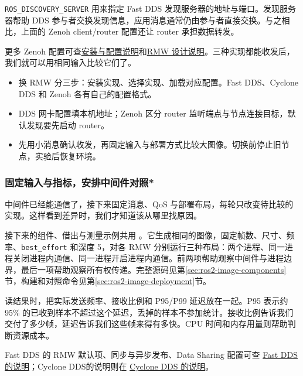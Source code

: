 \texttt{ROS\_DISCOVERY\_SERVER} 用来指定 Fast DDS 发现服务器的地址与端口。发现服务器帮助 DDS 参与者交换发现信息，应用消息通常仍由参与者直接交换。与之相比，上面的 Zenoh client/router 配置还让 router 承担数据转发。

更多 Zenoh 配置可查\href{https://github.com/ros2/rmw_zenoh/blob/humble/README.md}{安装与配置说明}和\href{https://github.com/ros2/rmw_zenoh/blob/humble/docs/design.md}{RMW 设计说明}。三种实现都能收发后，我们就可以用相同输入比较它们了。

\begin{conclusion}
\begin{itemize}
\item 换 RMW 分三步：安装实现、选择实现、加载对应配置。Fast DDS、Cyclone DDS 和 Zenoh 各有自己的配置格式。
\item DDS 网卡配置填本机地址；Zenoh 区分 router 监听端点与节点连接目标，默认发现要先启动 router。
\item 先用小消息确认收发，再固定输入与部署方式比较大图像。切换前停止旧节点，实验后恢复环境。
\end{itemize}
\end{conclusion}

\subsubsection{固定输入与指标，安排中间件对照*}
中间件已经能通信了，接下来固定消息、QoS 与部署布局，每轮只改变待比较的实现。这样看到差异时，我们才知道该从哪里找原因。

\begin{example}[安排一个可以解释结果的对照]
接下来的组件、借出与测量示例共用 。它生成相同的图像，固定帧数、尺寸、频率、\texttt{best\_effort} 和深度 5，对各 RMW 分别运行三种布局：两个进程、同一进程关闭进程内通信、同一进程开启进程内通信。前两项帮助观察中间件与进程边界，最后一项帮助观察所有权传递。完整源码见第\ref{sec:ros2-image-components}节，构建和对照命令见第\ref{sec:ros2-image-deployment}节。

读结果时，把实际发送频率、接收比例和 P95/P99 延迟放在一起。P95 表示约 95\% 的已收到样本不超过这个延迟，丢掉的样本不参加统计。接收比例告诉我们交付了多少帧，延迟告诉我们这些帧来得有多快。CPU 时间和内存用量则帮助判断资源成本。
\end{example}

Fast DDS 的 RMW 默认项、同步与异步发布、Data Sharing 配置可查 \href{https://github.com/ros2/rmw_fastrtps/blob/humble/README.md}{Fast DDS 的说明}；Cyclone DDS的说明则在 \href{https://github.com/ros2/rmw_cyclonedds/blob/humble/README.md}{Cyclone DDS 的说明}。

